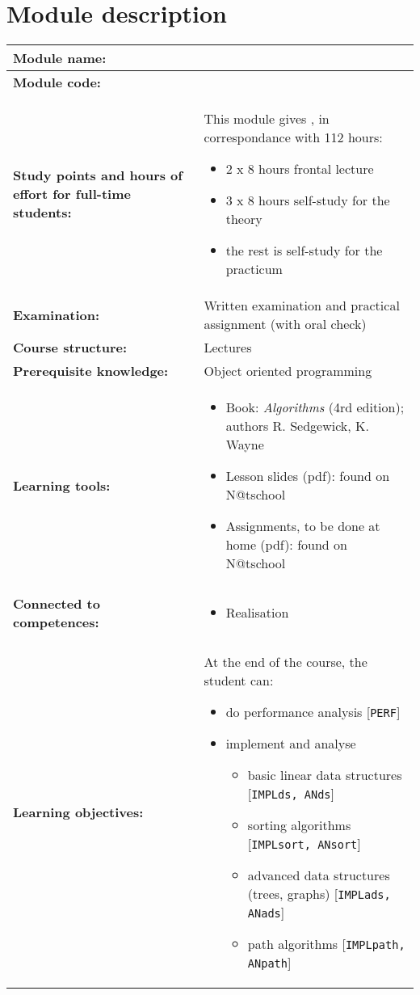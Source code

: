 \section*{Module description}
\begin{tabularx}{\textwidth}{|>{\columncolor{lichtGrijs}} p{}|X|}
	\hline
	\textbf{Module name:} & \modulenaam\\
	\hline
	\textbf{Module code: }& \modulecode\\
	\hline
	\textbf{Study points \newline and hours of effort for full-time students:} & This module gives \stdPunten, in correspondance with 112 hours:
	\begin{itemize}
		\item 2 x 8 hours frontal lecture
		\item 3 x 8 hours self-study for the theory
		\item the rest is self-study for the practicum
	\end{itemize} \\
	\hline
	\textbf{Examination:} & Written examination and practical assignment (with oral check) \\
	\hline
	\textbf{Course structure:} & Lectures \\
	\hline
	\textbf{Prerequisite knowledge:} & Object oriented programming \\
	\hline
	\textbf{Learning tools:} & \begin{itemize}
			\item Book: \textit{Algorithms} (4rd edition); authors R. Sedgewick, K. Wayne
			\item Lesson slides (pdf): found on N@tschool
			\item Assignments, to be done at home (pdf): found on N@tschool
		\end{itemize} \\
	\hline
	\textbf{Connected to \newline competences:} & \begin{itemize}
			\item Realisation
		\end{itemize} \\
	\hline
	\textbf{Learning objectives:} &
		At the end of the course, the student can:
			\begin{itemize}
				\item do performance analysis [\texttt{PERF}]
				\item implement and analyse 
					\begin{itemize}
						\item basic linear data structures [\texttt{IMPLds, ANds}]
						\item sorting algorithms [\texttt{IMPLsort, ANsort}]
						\item advanced data structures (trees, graphs) [\texttt{IMPLads, ANads}]
						\item path algorithms [\texttt{IMPLpath, ANpath}]
					\end{itemize}
			\end{itemize} \\
	\hline


\end{tabularx}
